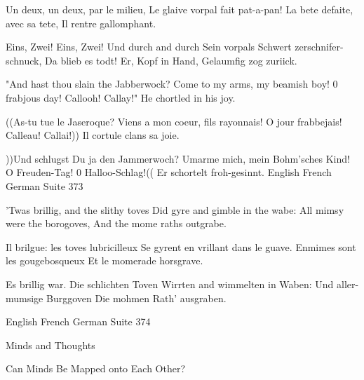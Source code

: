        Un deux, un deux, par le milieu,
       Le glaive vorpal fait pat-a-pan!
       La bete defaite, avec sa tete,
       Il rentre gallomphant.

              Eins, Zwei! Eins, Zwei! Und durch and durch
              Sein vorpals Schwert zerschnifer-schnuck,
              Da blieb es todt! Er, Kopf in Hand,
              Gelaumfig zog zuriick.

"And hast thou slain the Jabberwock?
Come to my arms, my beamish boy!
0 frabjous day! Callooh! Callay!"
He chortled in his joy.

       ((As-tu tue le Jaseroque?
       Viens a mon coeur, fils rayonnais!
       O jour frabbejais! Calleau! Callai!))
       Il cortule clans sa joie.

              ))Und schlugst Du ja den Jammerwoch?
              Umarme mich, mein Bohm'sches Kind!
              O Freuden-Tag! 0 Halloo-Schlag!((
              Er schortelt froh-gesinnt.
English French German Suite                                 373

      'Twas brillig, and the slithy toves
      Did gyre and gimble in the wabe:
      All mimsy were the borogoves,
      And the mome raths outgrabe.

             Il brilgue: les toves lubricilleux
             Se gyrent en vrillant dans le guave.
             Enmimes sont les gougebosqueux
             Et le momerade horsgrave.

                     Es brillig war. Die schlichten Toven
                     Wirrten and wimmelten in Waben:
                     Und aller-mumsige Burggoven
                     Die mohmen Rath' ausgraben.




English French German Suite                                 374


                                Minds and Thoughts

                      Can Minds Be Mapped onto Each Other?

